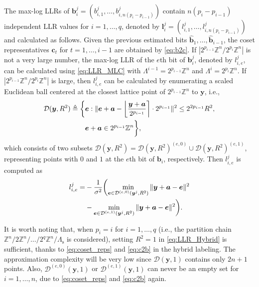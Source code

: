 \documentclass[journal]{IEEEtran}
\newcommand{\Z}{\mathbb{Z}}
\newcommand{\D}{\mathcal{D}}
\newcommand{\ba}{\boldsymbol{a}}
\newcommand{\bb}{\boldsymbol{b}}
\newcommand{\bc}{\boldsymbol{c}}
\newcommand{\be}{\boldsymbol{e}}
\newcommand{\bl}{\boldsymbol{l}}
\newcommand{\by}{\boldsymbol{y}}
\newcommand{\Lambdas}{\Lambda_\mathrm{s}}
\begin{document}
The max-log LLRs of $\bb_i^j=(b_{i,1}^j,\dots,b_{i,n(p_i-p_{i-1})}^j)$ contain $n(p_i-p_{i-1})$ independent LLR values for $i=1,\ldots,q$, denoted by $\bl_i^j=(l_{i,1}^j,\dots,l_{i,n(p_i-p_{i-1})}^j)$ and calculated as follows. Given the previous estimated bits $\hat{\bb}_1,\dots,\hat{\bb}_{i-1}$, the coset representatives $\bc_t$ for $t=1,\ldots,i-1$ are obtained by \eqref{eq:b2c}. If $|2^{p_{i-1}}\Z^n/2^{p_i}\Z^n|$ is not a very large number, the max-log LLR of the $e$th bit of $\bb_i^j$, denoted by $l_{i,e}^j$, can be calculated using \eqref{eq:LLR_MLC} with ${\Lambda^{i-1}=2^{p_{i-1}}\Z^n}$ and ${\Lambda^i=2^{p_i}\Z^n}$. If $|2^{p_{i-1}}\Z^n/2^{p_i}\Z^n|$ is large, then $l_{i,e}^j$ can be calculated by enumerating a scaled Euclidean ball centered at the closest lattice point of $2^{p_{i-1}}\Z^n$ to $\by$, i.e.,
\begin{align}
    \D(\by,R^2)\triangleq\biggl\{&\be:\|\be+\ba-\left \lfloor \frac{\by+\ba}{2^{p_{i-1}}}  \right \rceil \cdot 2^{p_{i-1}} \|^2 \leq 2^{2p_{i-1}}R^2, \notag \\ &\be+\ba \in 2^{p_{i-1}}\Z^n\biggr\},\label{eq:D}
\end{align}
which consists of two subsets $\D(\by,R^2)=\D(\by,R^2)^{(e,0)}\cup\D(\by,R^2)^{(e,1)}$, representing points with $0$ and $1$ at the $e$th bit of $\bb_i$, respectively. Then $l_{i,e}^j$ is computed as
\begin{align}\label{eq:LLR_Hybrid}
        l_{i,e}^j=&-\frac{1}{\sigma^2}\biggl(\min_{\be\in\D^{(e,0)}(\by^j,R^2)}\|\by+\ba-\be\|^2 \notag \\&- \min_{\be\in\D^{(e,1)}(\by^j,R^2)}\|\by+\ba-\be\|^2\biggr).
\end{align}

It is worth noting that, when $p_i=i$ for $i=1,\ldots,q$ (i.e., the partition chain $\Z^n/2\Z^n/\dots/2^q\Z^n/\Lambdas$ is considered), setting $R^2=1$ in \eqref{eq:LLR_Hybrid} is sufficient, thanks to \eqref{eq:coset_reps} and \eqref{eq:c2b} in the hybrid labeling. The approximation complexity will be very low since $\D(\by,1)$ contains only $2n+1$ points. Also, $\D^{(e,0)}(\by,1)$ or $\D^{(e,1)}(\by,1)$ can never be an empty set for $i=1,\ldots,n$, due to \eqref{eq:coset_reps} and \eqref{eq:c2b} again.
\end{document}
